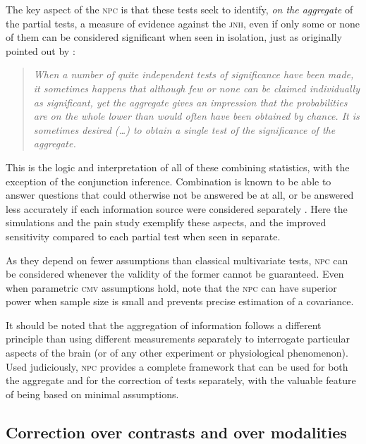 The key aspect of the \textsc{npc} is that these tests seek to identify, \emph{on the aggregate} of the partial tests, a measure of evidence against the \textsc{jnh}, even if only some or none of them can be considered significant when seen in isolation, just as originally pointed out by \citet{Fisher1932}:

\begin{quote}
\emph{When a number of quite independent tests of significance have been made, it sometimes happens that although few or none can be claimed individually as significant, yet the aggregate gives an impression that the probabilities are on the whole lower than would often have been obtained by chance. It is sometimes desired (\ldots) to obtain a single test of the significance of the aggregate.}
\end{quote}

\noindent
This is the logic and interpretation of all of these combining statistics, with the exception of the conjunction inference. Combination is known to be able to answer questions that could otherwise not be answered be at all, or be answered less accurately if each information source were considered separately \citep{Draper1992}. Here the simulations and the pain study exemplify these aspects, and the improved sensitivity compared to each partial test when seen in separate.

As they depend on fewer assumptions than classical multivariate tests, \textsc{npc} can be considered whenever the validity of the former cannot be guaranteed. Even when parametric \textsc{cmv} assumptions hold, note that the \textsc{npc} can have superior power when sample size is small and prevents precise estimation of a covariance.

It should be noted that the aggregation of information follows a different principle than using different measurements separately to interrogate particular aspects of the brain (or of any other experiment or physiological phenomenon). Used judiciously, \textsc{npc} provides a complete framework that can be used for both the aggregate and for the correction of tests separately, with the valuable feature of being based on minimal assumptions.

\subsection{Correction over contrasts and over modalities}

